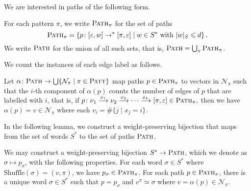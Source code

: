 We are interested in paths of the following form.

\begin{definition}\label{defn:path-sets}
	For each pattern $\pi$, we write $\textsc{Path}_\pi$ for the set of paths
	\[
	\textsc{Path}_\pi
	=
	\left\{
		p\colon
		[\varepsilon,w]
		\to^*
		[\pi, \varepsilon]
	\mid
		w \in S^* \text{ with }|w|_S \leqslant d
	\right\}.
	\]
	We write $\textsc{Path}$ for the union of all such sets, that is,
	$
		\textsc{Path}
		=
		\bigcup_\pi \textsc{Path}_\pi
	$.
\end{definition}

We count the instances of each edge label as follows.

\begin{definition}
	Let $\alpha \colon \textsc{Path} \to \bigcup\{ \mathcal{N}_\pi \mid \pi \in \textsc{Patt} \}$ map paths $p \in \textsc{Path}_\pi$ to vectors in $\mathcal{N}_\pi$ such that the $i$-th component of $\alpha(p)$ counts the number of edges of $p$ that are labelled with $i$, that is, if
	$
		p\colon
		\nu_1 \xrightarrow{x_1}
		\nu_2 \xrightarrow{x_2}
		\cdots \xrightarrow{x_k}
		[\pi,\varepsilon] \in \textsc{Path}_\pi,
	$
	then we have $\alpha(p) = v \in \mathcal{N}_\pi$ where each $v_i = \#\{j \mid x_j = i\}$.
\end{definition}

In the following lemma, we construct a weight-preserving bijection that maps from the set of words $S^*$ to the set of paths $\textsc{Path}$.

\begin{lemma}\label{lemma:path-to-special-form}
	We may construct a weight-preserving bijection $S^* \to \textsc{Path}$, which we denote as $\sigma \mapsto p_\sigma$, with the following properties.
	For each word $\sigma \in S^*$ where $\mathrm{Shuffle}(\sigma) = (v,\pi)$, we have $p_\sigma \in \textsc{Path}_\pi$.
	For each path $p \in \textsc{Path}_\pi$, there is a unique word $\sigma \in S^*$ such that $p = p_\sigma$ and $v^\pi \simeq \sigma$ where $v = \alpha(p) \in \mathcal{N}_\pi$.
\end{lemma}

